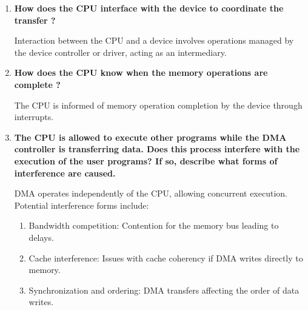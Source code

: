 \documentclass{article}
\begin{document}
\begin{enumerate}[label=(\alph*)]
    \item \textbf{How does the CPU interface with the device to coordinate the transfer ?}
    
    Interaction between the CPU and a device involves operations managed by the device controller or driver, acting as an intermediary.

    \item \textbf{How does the CPU know when the memory operations are complete ?}
    
    The CPU is informed of memory operation completion by the device through interrupts.

    \item \textbf{The CPU is allowed to execute other programs while the DMA controller is transferring
data. Does this process interfere with the execution of the user programs? If so, describe
what forms of interference are caused.}
    
    DMA operates independently of the CPU, allowing concurrent execution. Potential interference forms include:
    \begin{enumerate}[label=\roman*)]
        \item Bandwidth competition: Contention for the memory bus leading to delays.
        \item Cache interference: Issues with cache coherency if DMA writes directly to memory.
        \item Synchronization and ordering: DMA transfers affecting the order of data writes.
    \end{enumerate}
\end{enumerate}
\end{document}
